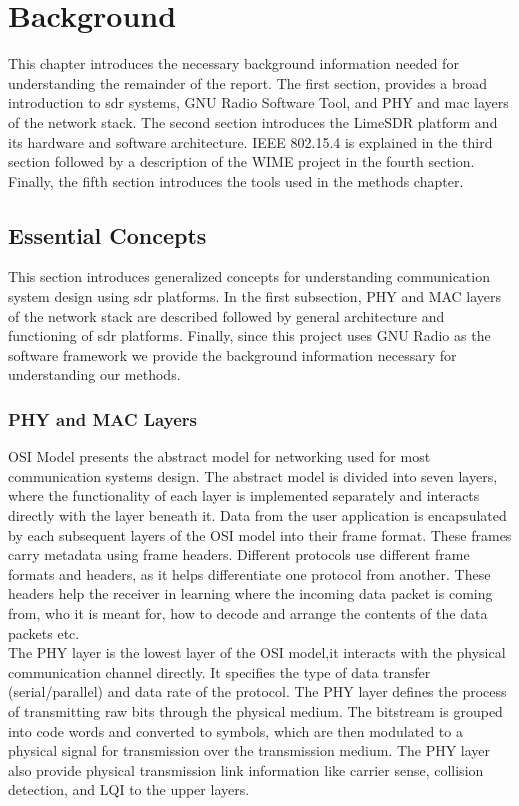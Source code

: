 \chapter{Background}
This chapter introduces the necessary background information needed for understanding the remainder of the report.
The first section, provides a broad introduction to \ac{sdr} systems, GNU Radio Software Tool, and \ac{PHY} and \ac{mac} layers of the network stack.
The second section introduces the LimeSDR platform and its hardware and software architecture.
IEEE 802.15.4 is explained in the third section followed by a description of the WIME project in the fourth section.
Finally, the fifth section introduces the tools used in the methods chapter.


\section{Essential Concepts}
This section introduces generalized concepts for understanding communication system design using \ac{sdr} platforms. In the first subsection, PHY and MAC layers of the network stack are described followed by general architecture and functioning of \ac{sdr} platforms. Finally, since this project uses GNU Radio as the software framework we provide the background information necessary for understanding our methods.

\subsection{PHY and MAC Layers}
\ac{OSI} Model \cite{noauthor_iso/iec_nodate} presents the abstract model for networking used for most communication systems design.
The abstract model is divided into seven layers,  where the functionality of each layer is implemented separately and interacts directly with the layer beneath it.
Data from the user application is encapsulated by each subsequent layers of the \ac{OSI} model into their frame format.
These frames carry metadata using frame headers.
Different protocols use different frame formats and headers, as it helps differentiate one protocol from another.
These headers help the receiver in learning where the incoming data packet is coming from, who it is meant for, how to decode and arrange the contents of the data packets etc.\\

The \ac{PHY} layer is the lowest layer of the \ac{OSI} model,it interacts with the physical communication channel directly.
It specifies the type of data transfer (serial/parallel) and data rate of the protocol.
The \ac{PHY} layer defines the process of transmitting raw bits through the physical medium.
The bitstream is grouped into code words and converted to symbols, which are then modulated to a physical signal for transmission over the transmission medium.
The \ac{PHY} layer also provide physical transmission link information like carrier sense, collision detection, and \ac{LQI}  to the upper layers. \\


